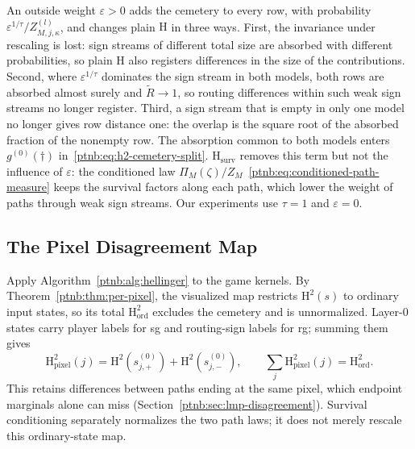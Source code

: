 An outside weight $\varepsilon>0$ adds the cemetery to every row, with probability $\varepsilon^{1/\tau}/Z^{(l)}_{M,j,\kappa}$, and changes plain $\mathrm H$ in three ways. First, the invariance under rescaling is lost: sign streams of different total size are absorbed with different probabilities, so plain $\mathrm H$ also registers differences in the size of the contributions. Second, where $\varepsilon^{1/\tau}$ dominates the sign stream in both models, both rows are absorbed almost surely and $\widetilde R\to1$, so routing differences within such weak sign streams no longer register. Third, a sign stream that is empty in only one model no longer gives row distance one: the overlap is the square root of the absorbed fraction of the nonempty row. The absorption common to both models enters $g^{(0)}(\dagger)$ in~\eqref{ptnb:eq:h2-cemetery-split}. $\mathrm H_{\mathrm{surv}}$ removes this term but not the influence of $\varepsilon$: the conditioned law $\Pi_M(\zeta)/Z_M$~\eqref{ptnb:eq:conditioned-path-measure} keeps the survival factors along each path, which lower the weight of paths through weak sign streams. Our experiments use $\tau=1$ and $\varepsilon=0$.

\subsection{The Pixel Disagreement Map}\label{sec:trajectory_pixel_map}
Apply Algorithm~\ref{ptnb:alg:hellinger} to the game kernels. By Theorem~\ref{ptnb:thm:per-pixel}, the visualized map restricts $\mathrm H^2(s)$ to ordinary input states, so its total $\mathrm H^2_{\mathrm{ord}}$ excludes the cemetery and is unnormalized. Layer-$0$ states carry player labels for \ac{sg} and routing-sign labels for \ac{rg}; summing them gives
\[
 \mathrm H^2_{\mathrm{pixel}}(j)=\mathrm H^2(s^{(0)}_{j,+})+\mathrm H^2(s^{(0)}_{j,-}),
 \qquad \sum_j\mathrm H^2_{\mathrm{pixel}}(j)=\mathrm H^2_{\mathrm{ord}}.
\]
This retains differences between paths ending at the same pixel, which endpoint marginals alone can miss (Section~\ref{ptnb:sec:lmp-disagreement}). Survival conditioning separately normalizes the two path laws; it does not merely rescale this ordinary-state map.

